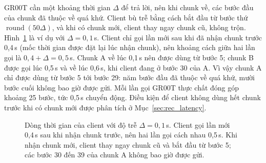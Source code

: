 \documentclass[12pt,a4paper,oneside]{report}
\begin{document}
GR00T cần một khoảng thời gian $\Delta$ để trả lời, nên khi chunk về, các bước đầu của chunk đã thuộc về quá khứ. Client bù trễ bằng cách bắt đầu từ bước thứ $\operatorname{round}(50\Delta)$, và khi có chunk mới, client thay ngay chunk cũ, không trộn. Hình~\ref{fig:timeline} là ví dụ với $\Delta = 0{,}1$\,s. Client chỉ gọi lần mới sau khi đã nhận chunk trước 0,4\,s (mốc thời gian được đặt lại lúc nhận chunk), nên khoảng cách giữa hai lần gọi là $0{,}4 + \Delta = 0{,}5$\,s. Chunk A về lúc 0,1\,s nên được dùng từ bước 5; chunk B được gọi lúc 0,5\,s và về lúc 0,6\,s, khi client đang ở bước 30 của A. Vì vậy chunk A chỉ được dùng từ bước 5 tới bước 29: năm bước đầu đã thuộc về quá khứ, mười bước cuối không bao giờ được gửi. Mỗi lần gọi GR00T thực chất đóng góp khoảng 25 bước, tức 0,5\,s chuyển động. Điều kiện để client không dùng hết chunk trước khi có chunk mới được phân tích ở Mục~\ref{sec:rec_latency}.

\begin{figure}[htbp]
\centering
{}
\caption[Dòng thời gian của client với độ trễ $\Delta = 0{,}1$\,s]{Dòng thời gian của client với độ trễ $\Delta = 0{,}1$\,s. Client gọi lần mới 0,4\,s sau khi nhận chunk trước, nên hai lần gọi cách nhau 0,5\,s. Khi nhận chunk mới, client thay ngay chunk cũ và bắt đầu từ bước 5; các bước 30 đến 39 của chunk A không bao giờ được gửi.}
\label{fig:timeline}
\end{figure}
\end{document}
